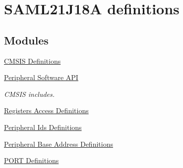 \hypertarget{group___s_a_m_l21_j18_a__definitions}{}\section{S\+A\+M\+L21\+J18\+A definitions}
\label{group___s_a_m_l21_j18_a__definitions}
\subsection*{Modules}
\begin{DoxyCompactItemize}
\item 
\hyperlink{group___s_a_m_l21_j18_a__cmsis}{C\+M\+S\+I\+S Definitions}
\item 
\hyperlink{group___s_a_m_l21_j18_a__api}{Peripheral Software A\+P\+I}
\begin{DoxyCompactList}\small\item\em C\+M\+S\+I\+S includes. \end{DoxyCompactList}\item 
\hyperlink{group___s_a_m_l21_j18_a__reg}{Registers Access Definitions}
\item 
\hyperlink{group___s_a_m_l21_j18_a__id}{Peripheral Ids Definitions}
\item 
\hyperlink{group___s_a_m_l21_j18_a__base}{Peripheral Base Address Definitions}
\item 
\hyperlink{group___s_a_m_l21_j18_a__port}{P\+O\+R\+T Definitions}
\end{DoxyCompactItemize}
